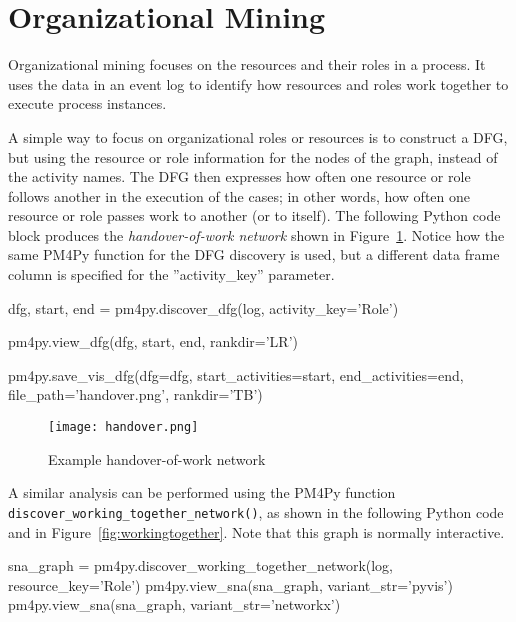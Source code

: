 \section{Organizational Mining}

Organizational mining focuses on the resources and their roles in a process. It uses the data in an event log to identify how resources and roles work together to execute process instances. 

A simple way to focus on organizational roles or resources is to construct a DFG, but using the resource or role information for the nodes of the graph, instead of the activity names. The DFG then expresses how often one resource or role follows another in the execution of the cases; in other words, how often one resource or role passes work to another (or to itself). The following Python code block produces the \emph{handover-of-work network} shown in Figure~\ref{fig:handover}. Notice how the same PM4Py function for the DFG discovery is used, but a different data frame column is specified for the ''activity\_key'' parameter.

\begin{samepage}
\begin{pythoncode}
dfg, start, end = pm4py.discover_dfg(log, activity_key='Role')

pm4py.view_dfg(dfg, start, end, rankdir='LR')

pm4py.save_vis_dfg(dfg=dfg,
    start_activities=start, 
    end_activities=end, 
    file_path='handover.png', rankdir='TB')
\end{pythoncode}
\end{samepage}

\begin{figure}
\centering
\texttt{[image: handover.png]}
\caption{Example handover-of-work network}
\label{fig:handover}
\end{figure}

A similar analysis can be performed using the PM4Py function \\ \texttt{discover\_working\_together\_network()}, as shown in the following Python code and in Figure~\ref{fig:workingtogether}. Note that this graph is normally interactive.

\begin{samepage}
\begin{pythoncode}
sna_graph = pm4py.discover_working_together_network(log,
   resource_key='Role')
pm4py.view_sna(sna_graph, variant_str='pyvis')   
pm4py.view_sna(sna_graph, variant_str='networkx')   
\end{pythoncode}
\end{samepage}

